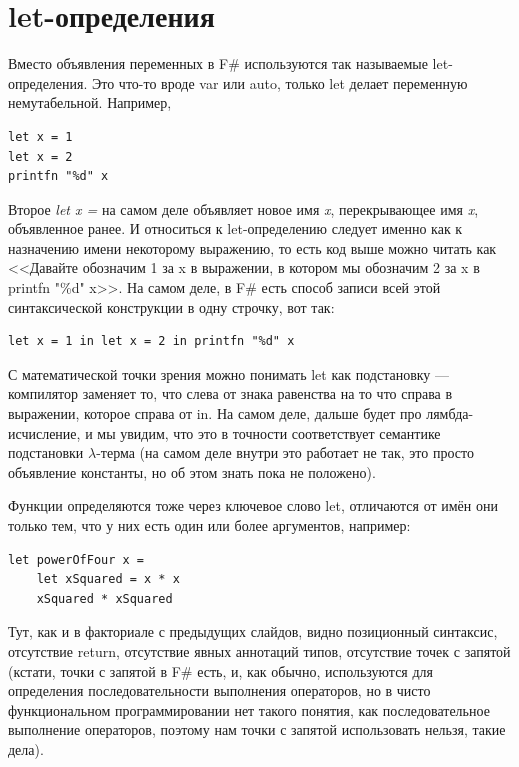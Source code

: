 \documentclass{../../text-style}
\begin{document}
\section{let-определения}

Вместо объявления переменных в F\# используются так называемые let-определения. Это что-то вроде var или auto, только let делает переменную немутабельной. Например,

\begin{verbatim}
let x = 1
let x = 2
printfn "%d" x
\end{verbatim}

Второе \textit{let x =} на самом деле объявляет новое имя \textit{x}, перекрывающее имя \textit{x}, объявленное ранее. И относиться к let-определению следует именно как к назначению имени некоторому выражению, то есть код выше можно читать как <<Давайте обозначим 1 за x в выражении, в котором мы обозначим 2 за x в printfn "\%d" x>>. На самом деле, в F\# есть способ записи всей этой синтаксической конструкции в одну строчку, вот так:

\begin{verbatim}
let x = 1 in let x = 2 in printfn "%d" x
\end{verbatim}

С математической точки зрения можно понимать let как подстановку --- компилятор заменяет то, что слева от знака равенства на то что справа в выражении, которое справа от in. На самом деле, дальше будет про лямбда-исчисление, и мы увидим, что это в точности соответствует семантике подстановки $\lambda$-терма (на самом деле внутри это работает не так, это просто объявление константы, но об этом знать пока не положено).

Функции определяются тоже через ключевое слово let, отличаются от имён они только тем, что у них есть один или более аргументов, например:

\begin{verbatim}
let powerOfFour x =
    let xSquared = x * x
    xSquared * xSquared
\end{verbatim}

Тут, как и в факториале с предыдущих слайдов, видно позиционный синтаксис, отсутствие return, отсутствие явных аннотаций типов, отсутствие точек с запятой (кстати, точки с запятой в F\# есть, и, как обычно, используются для определения последовательности выполнения операторов, но в чисто функциональном программировании нет такого понятия, как последовательное выполнение операторов, поэтому нам точки с запятой использовать нельзя, такие дела).
\end{document}
